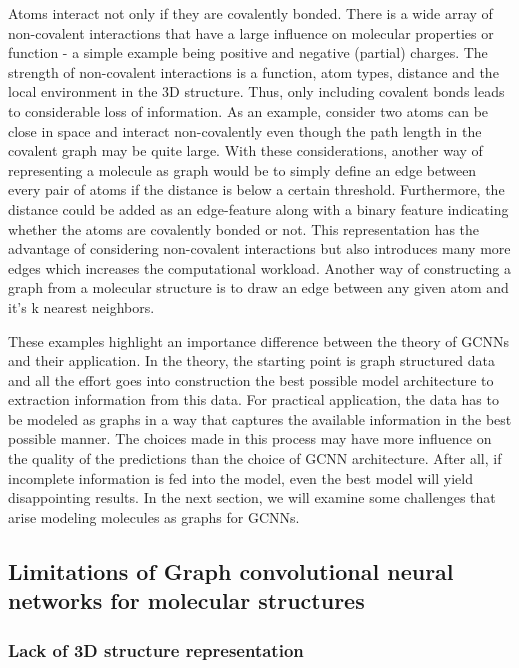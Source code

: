 Atoms interact not only if they are covalently bonded. There is a wide array of non-covalent interactions that have a large influence on molecular properties or function - a simple example being positive and negative (partial) charges. The strength of non-covalent interactions is a function, atom types, distance and the local environment in the 3D structure. Thus, only including covalent bonds leads to considerable loss of information. As an example, consider two atoms can be close in space and interact non-covalently even though the path length in the covalent graph may be quite large.
With these considerations, another way of representing a molecule as graph would be to simply define an edge between every pair of atoms if the distance is below a certain threshold. Furthermore, the distance could be added as an edge-feature along with a binary feature indicating whether the atoms are covalently bonded or not. This representation has the advantage of considering non-covalent interactions but also introduces many more edges which increases the computational workload. Another way of constructing a graph from a molecular structure is to draw an edge between any given atom and it's k nearest neighbors.

These examples highlight an importance difference between the theory of GCNNs and their application. In the theory, the starting point is graph structured data and all the effort goes into construction the best possible model architecture to extraction information from this data. For practical application, the data has to be modeled as graphs in a way that captures the available information in the best possible manner. The choices made in this process may have more influence on the quality of the predictions than the choice of GCNN architecture. After all, if incomplete information is fed into the model, even the best model will yield disappointing results. In the next section, we will examine some challenges that arise modeling molecules as graphs for GCNNs.



\subsection{Limitations of Graph convolutional neural networks for molecular structures}
\label{sec:limitations}

\subsubsection{Lack of 3D structure representation}
\label{sec:lack-of-3d-structure}


